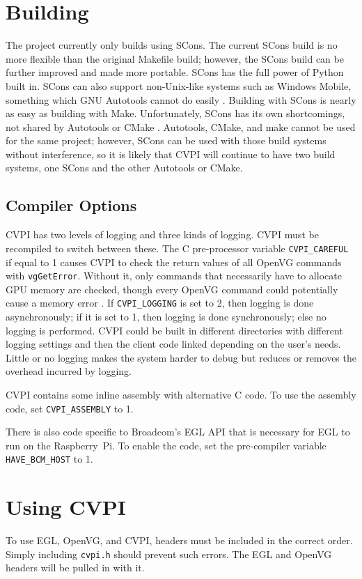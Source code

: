 \documentclass[12pt]{report}
\begin{document}
\chapter{Building}
\label{sec-8}
The project currently only builds using SCons. The current SCons build
is no more flexible than the original Makefile build; however, the
SCons build can be further improved and made more portable. SCons has
the full power of Python built in. SCons can also support
non-Unix-like systems such as Windows Mobile, something which GNU
Autotools cannot do easily \cite{whySCons}. Building with SCons is
nearly as easy as building with Make. Unfortunately, SCons has its own
shortcomings, not shared by Autotools or CMake
\cite{gentooSCons}. Autotools, CMake, and make cannot be used for the
same project; however, SCons can be used with those build systems
without interference, so it is likely that CVPI will continue to have
two build systems, one SCons and the other Autotools or CMake.

\section{Compiler Options}
CVPI has two levels of logging and three kinds of logging. CVPI must
be recompiled to switch between these. The C pre-processor variable
{\tt CVPI\_CAREFUL} if equal to 1 causes CVPI to check the return
values of all OpenVG commands with {\tt vgGetError}. Without it, only
commands that necessarily have to allocate GPU memory are checked,
though every OpenVG command could potentially cause a memory error
\cite[p.~29]{openvg}. If {\tt CVPI\_LOGGING} is set to 2, then logging
is done asynchronously; if it is set to 1, then logging is done
synchronously; else no logging is performed. CVPI could be built in
different directories with different logging settings and then the
client code linked depending on the user's needs. Little or no logging
makes the system harder to debug but reduces or removes the overhead
incurred by logging.

CVPI contains some inline assembly with alternative C code. To use the
assembly code, set {\tt CVPI\_ASSEMBLY} to 1.

There is also code specific to Broadcom's EGL API that is necessary
for EGL to run on the Raspberry~Pi. To enable the code, set
the pre-compiler variable {\tt HAVE\_BCM\_HOST} to 1.

\chapter{Using CVPI}
To use EGL, OpenVG, and CVPI, headers must be included in the correct
order. Simply including {\tt cvpi.h} should prevent such errors. The
EGL and OpenVG headers will be pulled in with it.
\end{document}
